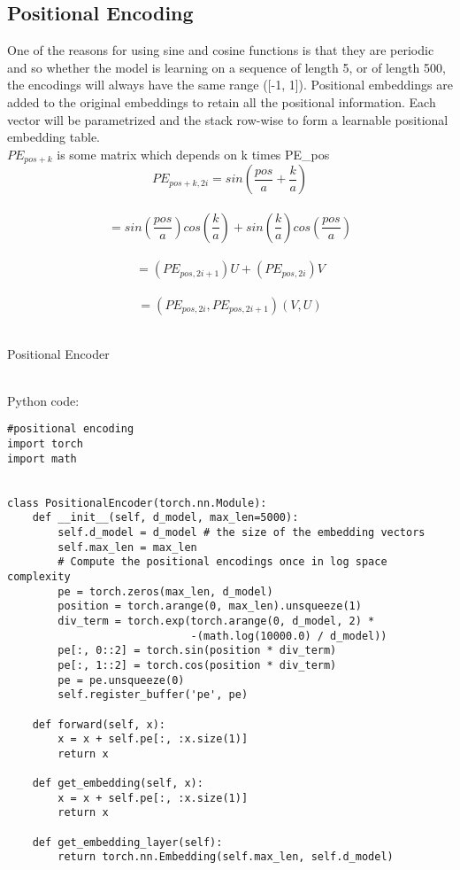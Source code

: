 \documentclass{article}
\begin{document}
\subsection{Positional Encoding}
One of the reasons for using sine and cosine functions is that they are periodic and so whether the model is learning on a sequence of length 5, or of length 500, the encodings will always have the same range ([-1, 1]).  Positional embeddings are added to the original embeddings to retain all the positional information. Each vector will be parametrized and the stack row-wise to form a learnable positional embedding table.
\\
$PE_{pos+k}$ is some matrix which depends on k times PE_{pos}\\
$$PE_{pos+k, 2i} = sin(\frac{pos}{a}+\frac{k}{a})$$\\
$$ =sin(\frac{pos}{a})cos(\frac{k}{a})+sin(\frac{k}{a})cos(\frac{pos}{a})$$\\
$$ =(PE_{pos,2i+1})U+(PE_{pos,2i})V$$\\
$$ =(PE_{pos,2i},PE_{pos,2i+1})(V,U)$$\\
\begin{algorithm}
\caption{Positional Encoder}
\begin{algorithmic}[1]

    \EndFor
\EndFor

\end{algorithmic}
\end{algorithm}


\\Python code:


\begin{lstlisting}
#positional encoding
import torch
import math


class PositionalEncoder(torch.nn.Module):
    def __init__(self, d_model, max_len=5000):
        self.d_model = d_model # the size of the embedding vectors
        self.max_len = max_len
        # Compute the positional encodings once in log space complexity
        pe = torch.zeros(max_len, d_model)
        position = torch.arange(0, max_len).unsqueeze(1)
        div_term = torch.exp(torch.arange(0, d_model, 2) *
                             -(math.log(10000.0) / d_model))
        pe[:, 0::2] = torch.sin(position * div_term)
        pe[:, 1::2] = torch.cos(position * div_term)
        pe = pe.unsqueeze(0)
        self.register_buffer('pe', pe)

    def forward(self, x):
        x = x + self.pe[:, :x.size(1)]
        return x

    def get_embedding(self, x):
        x = x + self.pe[:, :x.size(1)]
        return x

    def get_embedding_layer(self):
        return torch.nn.Embedding(self.max_len, self.d_model)

\end{lstlisting}
\clearpage
\end{document}
